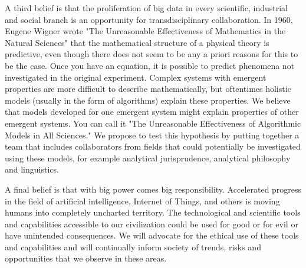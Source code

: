A third belief is that the proliferation of big data in every scientific, industrial and social branch is an opportunity for transdisciplinary collaboration. In 1960, Eugene Wigner wrote "The Unreasonable Effectiveness of Mathematics in the Natural Sciences" that the mathematical structure of a physical theory is predictive, even though there does not seem to be any a priori reasons for this to be the case. Once you have an equation, it is possible to predict phenomena not investigated in the original experiment. Complex systems with emergent properties are more difficult to describe mathematically, but oftentimes holistic models (usually in the form of algorithms) explain these properties. We believe that models developed for one emergent system might explain properties of other emergent systems. You can call it "The Unreasonable Effectiveness of Algorithmic Models in All Sciences." We propose to test this hypothesis by putting together a team that includes collaborators from fields that could potentially be investigated using these models, for example analytical jurisprudence, analytical philosophy and linguistics. 

A final belief is that with big power comes big responsibility. Accelerated progress in the field of artificial intelligence, Internet of Things, and others is moving humans into completely uncharted territory. The technological and scientific tools and capabilities accessible to our civilization could be used for good or for evil or have unintended consequences. We will advocate for the ethical use of these tools and capabilities and will continually inform society of trends, risks and opportunities that we observe in these areas.
